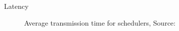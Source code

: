 \documentclass{beamer}
\begin{document}
\begin{frame}{Latency}
  \begin{figure}
    \centering
    \caption{\small Average transmission time for schedulers, \textcolor{uos-grey-full}{Source: {\cite{lowlatschedulers}}}}
  \end{figure}
\end{frame}


\end{document}
